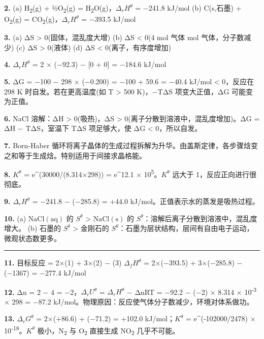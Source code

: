 \textbf{2.}
(a) H\textsubscript{2}(g) + ½O\textsubscript{2}(g) = H\textsubscript{2}O(g)，\(\Delta_r H^\theta\) = −241.8 kJ/mol
(b) C(s,石墨) + O\textsubscript{2}(g) = CO\textsubscript{2}(g)，\(\Delta_r H^\theta\) = −393.5 kJ/mol

\textbf{3.}
(a) ΔS \textgreater{} 0(固体，混乱度大增)
(b) ΔS \textless{} 0(4 mol 气体 mol 气体，分子数减少)
(c) ΔS \textgreater{} 0(液体)
(d) ΔS \textless{} 0(离子，有序度增加)

\textbf{4.} \(\Delta_r H^\theta\) = 2 × (−92.3) − {[}0 + 0{]} = −184.6 kJ/mol

\textbf{5.} ΔG = −100 − 298 × (−0.200) = −100 + 59.6 = −40.4 kJ/mol \textless{} 0，反应在 298 K 时自发。若在更高温度(如 T \textgreater{} 500 K)，−TΔS 项变大正值，ΔG 可能变为正值。

\textbf{6.} NaCl 溶解：ΔH \textgreater{} 0(吸热)，ΔS \textgreater{} 0(离子分散到溶液中，混乱度增加)。ΔG = ΔH − TΔS，室温下 TΔS 项足够大，使 ΔG \textless{} 0，所以自发。

\textbf{7.} Born-Haber 循环将离子晶体的生成过程拆解为升华。由盖斯定律，各步骤焓变之和等于生成焓。特别适用于间接求晶格能。

\textbf{8.} \(K^\theta\) = e\^{}(30000/(8.314×298)) = e\^{}12.1  × 10\textsuperscript{5}。\(K^\theta\) 远大于 1，反应正向进行很彻底。

\textbf{9.} \(\Delta_r H^\theta\) = −241.8 − (−285.8) = +44.0 kJ/mol。正值表示水的蒸发是吸热过程。

\textbf{10.}
(a) \(\mathrm{NaCl(aq)}\) 的 \(S^\theta\) \textgreater{} \(\mathrm{NaCl(s)}\) 的 \(S^\theta\)：溶解后离子分散到溶液中，混乱度增大。
(b) 石墨的 \(S^\theta\) \textgreater{} 金刚石的 \(S^\theta\)：石墨为层状结构，层间有自由电子运动，微观状态数更多。

\begin{center}\rule{0.5\linewidth}{0.5pt}\end{center}

\textbf{11.} 目标反应 = 2×(1) + 3×(2) − (3)
\(\Delta_f H^\theta\) = 2×(−393.5) + 3×(−285.8) − (−1367) = −277.4 kJ/mol

\textbf{12.} Δn = 2 − 4 = −2，\(\Delta_r U^\theta\) = \(\Delta_r H^\theta\) − ΔnRT = −92.2 − (−2) × 8.314 × 10\textsuperscript{-3} × 298 = −87.2 kJ/mol。物理原因：反应使气体分子数减少，环境对体系做功。

\textbf{13.} \(\Delta_r G^\theta\) = 2×(+86.6) + (−71.2) = +102.0 kJ/mol；\(K^\theta\) = e\^{}(-102000/2478)  × 10\textsuperscript{-18}。\(K^\theta\) 极小，N\textsubscript{2} 与 O\textsubscript{2} 直接生成 NO\textsubscript{2} 几乎不可能。

